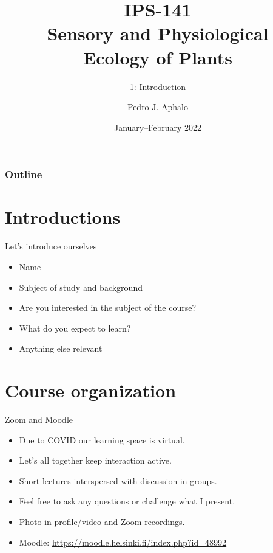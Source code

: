 \documentclass[10pt]{beamer}
\begin{document}
\title{IPS-141\\Sensory and Physiological\\Ecology of  Plants}
\subtitle{1: Introduction}
\author{Pedro J. Aphalo}
\date{January--February 2022}


  \begin{frame}
    \maketitle
  \end{frame}



  \begin{frame}
    \frametitle{Outline}
    \tableofcontents
  \end{frame}

\section{Introductions}

\begin{frame}{Let's introduce ourselves \Discussion}
  \begin{itemize}
    \item Name
    \item Subject of study and background
    \item Are you interested in the subject of the course?
    \item What do you expect to learn?
    \item Anything else relevant
  \end{itemize}
\end{frame}

\section{Course organization}

\begin{frame}{Zoom and Moodle}
\begin{itemize}
  \item Due to COVID our learning space is virtual.
  \item Let's all together keep interaction active.
  \item Short lectures interspersed with discussion in groups.
  \item Feel free to ask any questions or challenge what I present.
  \item Photo in profile/video and Zoom recordings.
  \item Moodle: \url{https://moodle.helsinki.fi/index.php?id=48992}
\end{itemize}
\end{frame}
\end{document}
